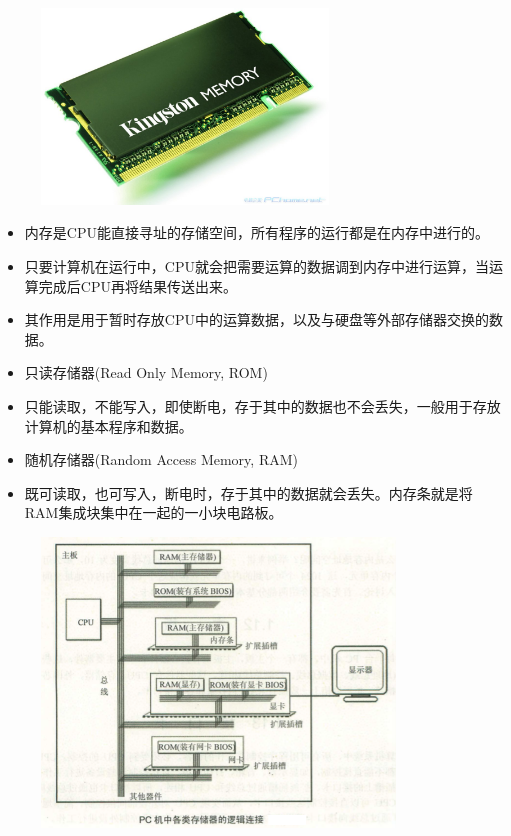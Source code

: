 \begin{frame}
\begin{figure}
\centering
\includegraphics[width=3in]{ch01/images/memory} 
\end{figure}
\end{frame}
 
\begin{frame}
\begin{itemize}
\item
内存是CPU能直接寻址的存储空间，所有程序的运行都是在内存中进行的。\\[0.1in]
\item
只要计算机在运行中，CPU就会把需要运算的数据调到内存中进行运算，当运算完成后CPU再将结果传送出来。\\[0.1in]
\item
其作用是用于暂时存放CPU中的运算数据，以及与硬盘等外部存储器交换的数据。\\[0.1in]
\end{itemize}
 \end{frame}
 
 \begin{frame}
 

\begin{itemize}
\item 只读存储器(Read Only Memory, ROM) 
\item[] 只能读取，不能写入，即使断电，存于其中的数据也不会丢失，一般用于存放计算机的基本程序和数据。\\[0.1in] 
\item 随机存储器(Random Access Memory, RAM) 
\item[] 既可读取，也可写入，断电时，存于其中的数据就会丢失。{内存条就是将RAM集成块集中在一起的一小块电路板。}\\[0.2in]

\end{itemize}
 \end{frame}
 
\begin{frame}[fragile]
\begin{figure}[h] 
\centering
\includegraphics[width=3.7in]{ch01/images/PCLink}
\end{figure}
\end{frame}
